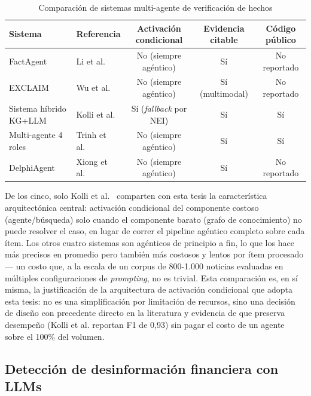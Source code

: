 \begin{table}[h]
\centering
\begin{tabular}{|l|l|c|c|c|}
\hline
\textbf{Sistema} & \textbf{Referencia} & \textbf{Activación condicional} & \textbf{Evidencia citable} & \textbf{Código público} \\
\hline
FactAgent & Li et al.~\cite{Li2024} & No (siempre agéntico) & Sí & No reportado \\
EXCLAIM & Wu et al.~\cite{Wu2024} & No (siempre agéntico) & Sí (multimodal) & No reportado \\
Sistema híbrido KG+LLM & Kolli et al.~\cite{Kolli2025} & Sí (\textit{fallback} por NEI) & Sí & Sí \\
Multi-agente 4 roles & Trinh et al.~\cite{Trinh2025} & No (siempre agéntico) & Sí & Sí \\
DelphiAgent & Xiong et al.~\cite{Xiong2025} & No (siempre agéntico) & Sí & No reportado \\
\hline
\end{tabular}
\caption{Comparación de sistemas multi-agente de verificación de hechos}
\label{tab:multiagente}
\end{table}

De los cinco, solo Kolli et al.~\cite{Kolli2025} comparten con esta tesis la característica arquitectónica central: activación condicional del componente costoso (agente/búsqueda) solo cuando el componente barato (grafo de conocimiento) no puede resolver el caso, en lugar de correr el pipeline agéntico completo sobre cada ítem. Los otros cuatro sistemas son agénticos de principio a fin, lo que los hace más precisos en promedio pero también más costosos y lentos por ítem procesado — un costo que, a la escala de un corpus de 800-1.000 noticias evaluadas en múltiples configuraciones de \textit{prompting}, no es trivial. Esta comparación es, en sí misma, la justificación de la arquitectura de activación condicional que adopta esta tesis: no es una simplificación por limitación de recursos, sino una decisión de diseño con precedente directo en la literatura y evidencia de que preserva desempeño (Kolli et al. reportan F1 de 0,93) sin pagar el costo de un agente sobre el 100\% del volumen.

\subsection{Detección de desinformación financiera con LLMs}

